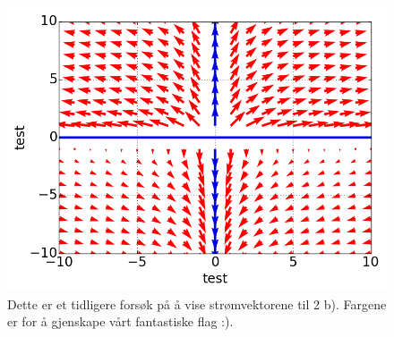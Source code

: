 \begin{figure}[H]
		\centering
		\includegraphics[width=0.7\linewidth]{../test.png}
		\caption{Dette er et tidligere forsøk på å vise
         strømvektorene til 2 b). Fargene er for å gjenskape vårt
         fantastiske flag :).}
		\label{fig_2b_test}
\end{figure}

\pagebreak


\pagebreak

\pagebreak

\pagebreak




\pagebreak




















%
